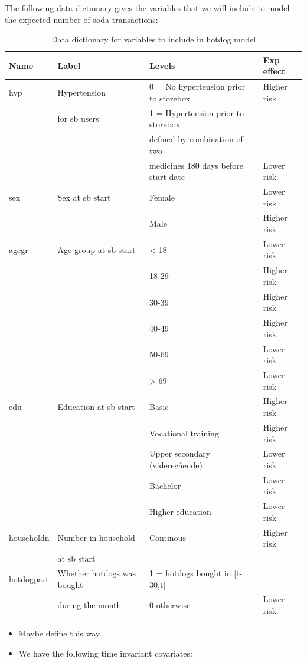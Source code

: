 \documentclass[
  11pt,
]{article}
\providecommand{\tightlist}{%
  \setlength{\itemsep}{0pt}\setlength{\parskip}{0pt}}
\begin{document}
The following data dictionary gives the variables that we will include
to model the expected number of soda transactions:

\begin{center}
\begin{table}[h]
\begin{tabular}{|l|l|l|l|} 
\hline
 Name & Label & Levels & Exp effect \\
\hline
hyp & Hypertension &  0 = No hypertension prior to storebox & Higher risk \\
 & for sb users &  1 = Hypertension prior to storebox &  \\
 & & defined by combination of two   & \\
 && medicines 180 days before start date & Lower risk \\
\hline
sex & Sex at sb start & Female & Lower risk \\
 & & Male & Higher risk \\
\hline
agegr & Age group at sb start & < 18 & Lower risk \\
 & & 18-29 & Higher risk \\
  & & 30-39 & Higher risk \\
   & & 40-49 & Higher risk \\
    & & 50-69 & Lower risk \\
     & & > 69 & Lower risk \\
     \hline
edu & Education at sb start & Basic & Higher risk \\
 & & Vocational training & Higher risk \\
  & & Upper secondary (videregående) & Lower risk \\
   & & Bachelor & Lower risk \\
    & & Higher education & Lower risk \\
    \hline
 householdn & Number in household & Continous & Higher risk \\
 & at sb start & & \\
     \hline
hotdogpast & Whether hotdogs was bought & 1 = hotdogs bought in [t-30,t] &  \\
& during the month & 0 otherwise& Lower risk\\
\hline
\end{tabular}
\caption{Data dictionary for variables to include in hotdog model}
\label{data_dic}
\end{table}
\end{center}

\begin{itemize}
\tightlist
\item
  Maybe define this way
\item
  We have the following time invariant covariates:
\end{itemize}
\end{document}
